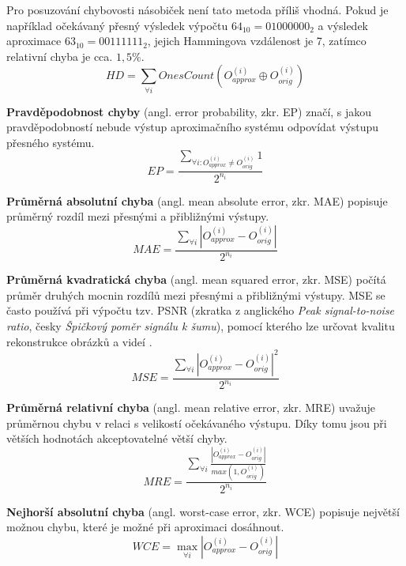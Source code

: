 Pro posuzování chybovosti násobiček není tato metoda příliš vhodná. Pokud je například očekávaný přesný výsledek výpočtu $64_{10} = 0100 0000_{2}$ a výsledek aproximace $63_{10} = 0011 1111_{2}$, jejich Hammingova vzdálenost je 7, zatímco relativní chyba je cca. $1,5 \%$.
\begin{equation}
    HD = \sum_{\forall i} OnesCount(O_{approx}^{(i)} \oplus O_{orig}^{(i)})
\end{equation}

\textbf{Pravděpodobnost chyby} (angl. error probability, zkr. EP) značí, s jakou pravděpodobností nebude výstup aproximačního systému odpovídat výstupu přesného systému.
\begin{equation}
    EP = \frac{\sum_{\forall {i:O_{approx}^{(i)} \neq O_{orig}^{(i)}}} 1} {2^{n_i}}
\end{equation}

\textbf{Průměrná absolutní chyba} (angl. mean absolute error, zkr. MAE) popisuje průměrný rozdíl mezi přesnými a přibližnými výstupy.
\begin{equation}
    MAE = \frac{\sum_{\forall i} {\left|{{O_{approx}^{(i)} - O_{orig}^{(i)}}}\right|}} {2^{n_i}}
\end{equation}

\textbf{Průměrná kvadratická chyba} (angl. mean squared error, zkr. MSE) počítá průměr druhých mocnin rozdílů mezi přesnými a přibližnými výstupy. MSE se často používá při výpočtu tzv. PSNR (zkratka z anglického \textit{Peak signal-to-noise ratio}, česky \textit{Špičkový poměr signálu k šumu}), pomocí kterého lze určovat kvalitu rekonstrukce obrázků a videí \cite{error_metrics}.
\begin{equation}
    MSE = \frac{\sum_{\forall i} {\left|{{O_{approx}^{(i)} - O_{orig}^{(i)}}}\right|^2}} {2^{n_i}}
\end{equation}

\textbf{Průměrná relativní chyba} (angl. mean relative error, zkr. MRE) uvažuje průměrnou chybu v relaci s velikostí očekávaného výstupu. Díky tomu jsou při větších hodnotách akceptovatelné větší chyby.
\begin{equation}
    MRE = \frac{\sum_{\forall i} \frac{\left|{{O_{approx}^{(i)} - O_{orig}^{(i)}}}\right|} {max(1,O_{orig}^{(i)})}} {2^{n_i}}
\end{equation}

\textbf{Nejhorší absolutní chyba} (angl. worst-case error, zkr. WCE) popisuje největší možnou chybu, které je možné při aproximaci dosáhnout.
\begin{equation}
    WCE = \max_{\forall i} \left|{O_{approx}^{(i)} - O_{orig}^{(i)}}\right|
\end{equation}

